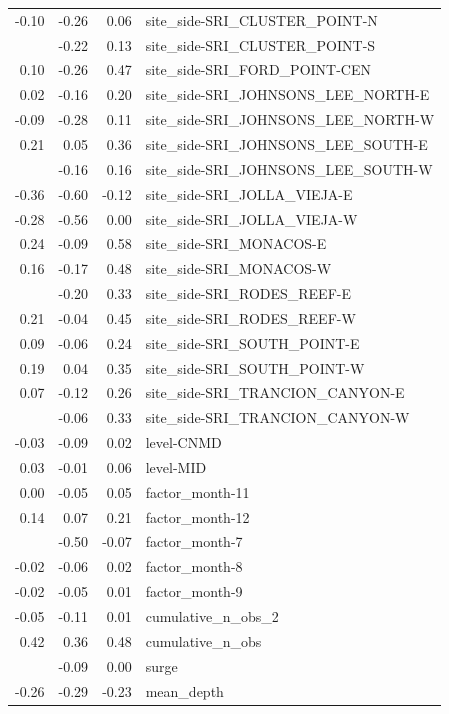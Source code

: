 \documentclass[]{article}
\begin{document}
\begin{longtable}[t]{rrrl}
-0.10 & -0.26 & 0.06 & site\_side-SRI\_CLUSTER\_POINT-N\\
\addlinespace
-0.05 & -0.22 & 0.13 & site\_side-SRI\_CLUSTER\_POINT-S\\
0.10 & -0.26 & 0.47 & site\_side-SRI\_FORD\_POINT-CEN\\
0.02 & -0.16 & 0.20 & site\_side-SRI\_JOHNSONS\_LEE\_NORTH-E\\
-0.09 & -0.28 & 0.11 & site\_side-SRI\_JOHNSONS\_LEE\_NORTH-W\\
0.21 & 0.05 & 0.36 & site\_side-SRI\_JOHNSONS\_LEE\_SOUTH-E\\
\addlinespace
0.00 & -0.16 & 0.16 & site\_side-SRI\_JOHNSONS\_LEE\_SOUTH-W\\
-0.36 & -0.60 & -0.12 & site\_side-SRI\_JOLLA\_VIEJA-E\\
-0.28 & -0.56 & 0.00 & site\_side-SRI\_JOLLA\_VIEJA-W\\
0.24 & -0.09 & 0.58 & site\_side-SRI\_MONACOS-E\\
0.16 & -0.17 & 0.48 & site\_side-SRI\_MONACOS-W\\
\addlinespace
0.06 & -0.20 & 0.33 & site\_side-SRI\_RODES\_REEF-E\\
0.21 & -0.04 & 0.45 & site\_side-SRI\_RODES\_REEF-W\\
0.09 & -0.06 & 0.24 & site\_side-SRI\_SOUTH\_POINT-E\\
0.19 & 0.04 & 0.35 & site\_side-SRI\_SOUTH\_POINT-W\\
0.07 & -0.12 & 0.26 & site\_side-SRI\_TRANCION\_CANYON-E\\
\addlinespace
0.14 & -0.06 & 0.33 & site\_side-SRI\_TRANCION\_CANYON-W\\
-0.03 & -0.09 & 0.02 & level-CNMD\\
0.03 & -0.01 & 0.06 & level-MID\\
0.00 & -0.05 & 0.05 & factor\_month-11\\
0.14 & 0.07 & 0.21 & factor\_month-12\\
\addlinespace
-0.28 & -0.50 & -0.07 & factor\_month-7\\
-0.02 & -0.06 & 0.02 & factor\_month-8\\
-0.02 & -0.05 & 0.01 & factor\_month-9\\
-0.05 & -0.11 & 0.01 & cumulative\_n\_obs\_2\\
0.42 & 0.36 & 0.48 & cumulative\_n\_obs\\
\addlinespace
-0.04 & -0.09 & 0.00 & surge\\
-0.26 & -0.29 & -0.23 & mean\_depth\\

\end{longtable}
\end{document}
